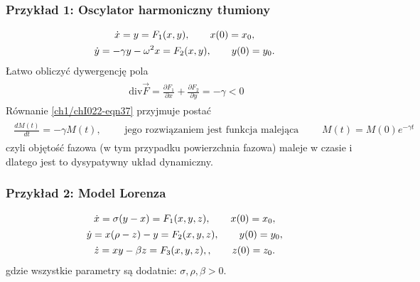 \documentclass[a4paper,12pt,polish]{sphinxmanual}
\begin{document}
\subsubsection{Przykład 1: Oscylator harmoniczny tłumiony}
\label{ch1/chI022:przyklad-1-oscylator-harmoniczny-tlumiony}\label{ch1/chI022:equation-eqn39}\begin{gather}
\begin{split}\dot x = y = F_1(x, y), \quad \quad x(0) = x_0,\end{split}\label{ch1/chI022-eqn39}\\\begin{split}\dot y = -\gamma y -\omega^2 x = F_2(x, y), \quad \quad y(0) = y_0.\end{split}\notag
\end{gather}
Łatwo obliczyć dywergencję pola
\label{ch1/chI022:equation-eqn40}\begin{gather}
\begin{split}\mbox{ div} \vec F =  \frac{\partial F_1}{\partial x} + \frac{\partial F_2}{\partial y} = -\gamma <0\end{split}\label{ch1/chI022-eqn40}
\end{gather}
Równanie \eqref{ch1/chI022-eqn37} przyjmuje postać
\label{ch1/chI022:equation-eqn41}\begin{gather}
\begin{split}\frac{dM(t)}{dt} = -\gamma  M(t),  \qquad \mbox{ jego rozwiązaniem jest funkcja malejąca } \qquad M(t) = M(0) e^{-\gamma t}\end{split}\label{ch1/chI022-eqn41}
\end{gather}
czyli  objętość fazowa (w tym przypadku powierzchnia fazowa) maleje  w czasie i dlatego jest to dysypatywny układ dynamiczny.


\subsubsection{Przykład 2: Model Lorenza}
\label{ch1/chI022:przyklad-2-model-lorenza}\label{ch1/chI022:equation-eqn42}\begin{gather}
\begin{split}\dot x = \sigma (y-x) = F_1(x, y,  z), \quad \quad x(0) = x_0,\end{split}\label{ch1/chI022-eqn42}\\\begin{split}\dot y = x(\rho - z) -y = F_2(x, y,  z),  \quad \quad y(0) = y_0,\end{split}\notag\\\begin{split}\dot z = x y - \beta z = F_3(x, y,  z), , \quad \quad z(0) = z_0.\end{split}\notag
\end{gather}
gdzie wszystkie parametry są dodatnie: $\sigma, \rho, \beta > 0$.
\end{document}
